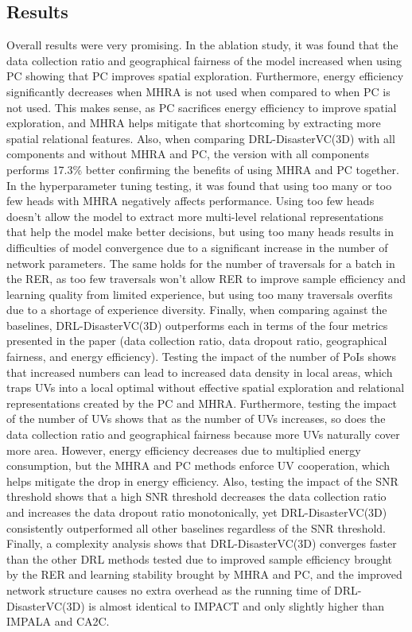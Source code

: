 \documentclass[sigconf, natbib=false]{acmart}
\begin{document}
   \subsection{Results}
   Overall results were very promising. In the ablation study, it was found that the data collection ratio and geographical fairness of the model increased when using PC showing that PC improves spatial exploration. Furthermore, energy efficiency significantly decreases when MHRA is not used when compared to when PC is not used. This makes sense, as PC sacrifices energy efficiency to improve spatial exploration, and MHRA helps mitigate that shortcoming by extracting more spatial relational features. Also, when comparing DRL-DisasterVC(3D) with all components and without MHRA and PC, the version with all components performs 17.3\% better confirming the benefits of using MHRA and PC together. In the hyperparameter tuning testing, it was found that using too many or too few heads with MHRA negatively affects performance. Using too few heads doesn't allow the model to extract more multi-level relational representations that help the model make better decisions, but using too many heads results in difficulties of model convergence due to a significant increase in the number of network parameters. The same holds for the number of traversals for a batch in the RER, as too few traversals won't allow RER to improve sample efficiency and learning quality from limited experience, but using too many traversals overfits due to a shortage of experience diversity. Finally, when comparing against the baselines, DRL-DisasterVC(3D) outperforms each in terms of the four metrics presented in the paper (data collection ratio, data dropout ratio, geographical fairness, and energy efficiency). Testing the impact of the number of PoIs shows that increased numbers can lead to increased data density in local areas, which traps UVs into a local optimal without effective spatial exploration and relational representations created by the PC and MHRA. Furthermore, testing the impact of the number of UVs shows that as the number of UVs increases, so does the data collection ratio and geographical fairness because more UVs naturally cover more area. However, energy efficiency decreases due to multiplied energy consumption, but the MHRA and PC methods enforce UV cooperation, which helps mitigate the drop in energy efficiency. Also, testing the impact of the SNR threshold shows that a high SNR threshold decreases the data collection ratio and increases the data dropout ratio monotonically, yet DRL-DisasterVC(3D) consistently outperformed all other baselines regardless of the SNR threshold. Finally, a complexity analysis shows that DRL-DisasterVC(3D) converges faster than the other DRL methods tested due to improved sample efficiency brought by the RER and learning stability brought by MHRA and PC, and the improved network structure causes no extra overhead as the running time of DRL-DisasterVC(3D) is almost identical to IMPACT and only slightly higher than IMPALA and CA2C.
   
\end{document}
